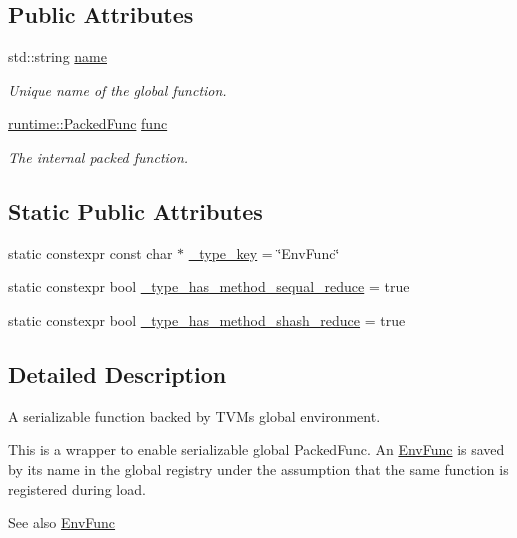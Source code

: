 \subsection*{Public Attributes}
\begin{DoxyCompactItemize}
\item 
std\+::string \hyperlink{classtvm_1_1EnvFuncNode_a03b61a3ac22549e110ef2369686f16ea}{name}
\begin{DoxyCompactList}\small\item\em Unique name of the global function. \end{DoxyCompactList}\item 
\hyperlink{classtvm_1_1runtime_1_1PackedFunc}{runtime\+::\+Packed\+Func} \hyperlink{classtvm_1_1EnvFuncNode_a83cd0f272d6f3551630480229b18ff05}{func}
\begin{DoxyCompactList}\small\item\em The internal packed function. \end{DoxyCompactList}\end{DoxyCompactItemize}
\subsection*{Static Public Attributes}
\begin{DoxyCompactItemize}
\item 
static constexpr const char $\ast$ \hyperlink{classtvm_1_1EnvFuncNode_a202ae30915b0d728ee73eaba5f3919e4}{\+\_\+type\+\_\+key} = \char`\"{}Env\+Func\char`\"{}
\item 
static constexpr bool \hyperlink{classtvm_1_1EnvFuncNode_a876e3cfce49b83fb62d9143136dfe5b8}{\+\_\+type\+\_\+has\+\_\+method\+\_\+sequal\+\_\+reduce} = true
\item 
static constexpr bool \hyperlink{classtvm_1_1EnvFuncNode_af9c25500c1ef7491607f8c40c28c3063}{\+\_\+type\+\_\+has\+\_\+method\+\_\+shash\+\_\+reduce} = true
\end{DoxyCompactItemize}


\subsection{Detailed Description}
A serializable function backed by T\+VM\textquotesingle{}s global environment. 

This is a wrapper to enable serializable global Packed\+Func. An \hyperlink{classtvm_1_1EnvFunc}{Env\+Func} is saved by its name in the global registry under the assumption that the same function is registered during load. \begin{DoxySeeAlso}{See also}
\hyperlink{classtvm_1_1EnvFunc}{Env\+Func} 
\end{DoxySeeAlso}


